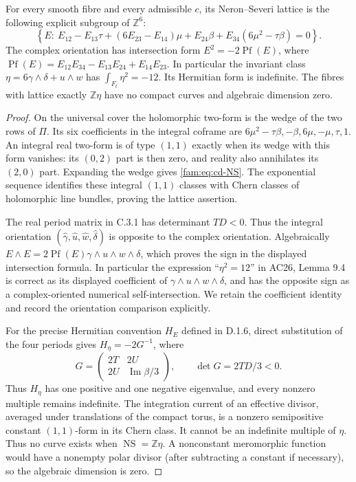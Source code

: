 \begin{proposition}\label{fam:src:D.1.4}\label{fam:st:D.1.4}
For every smooth fibre and every admissible \(c\), its Neron--Severi lattice
is the following explicit subgroup of \(\mathbb Z^6\):
\begin{equation}\label{fam:eq:cd-NS}
 \left\{E:\ E_{12}-E_{13}\tau+(6E_{23}-E_{14})\mu+
 E_{24}\beta+E_{34}(6\mu^2-\tau\beta)=0\right\}.
\end{equation}
The complex orientation has intersection form
\(E^2=-2\operatorname{Pf}(E)\), where
\(\operatorname{Pf}(E)=E_{12}E_{34}-E_{13}E_{24}+E_{14}E_{23}\).
In particular the invariant class \(\eta=6\gamma\wedge\delta+u\wedge w\)
has \(\int_{F_t}\eta^2=-12\). Its Hermitian form is indefinite.
The fibres with lattice exactly \(\mathbb Z\eta\) have no compact curves
and algebraic dimension zero.
\end{proposition}
\begin{proof}
On the universal cover the holomorphic two-form is the wedge of the two
rows of \(\Pi\). Its six coefficients in the integral coframe are
\(6\mu^2-\tau\beta,-\beta,6\mu,-\mu,\tau,1\).
An integral real two-form is of type \((1,1)\) exactly when its wedge
with this form vanishes: its \((0,2)\) part is then zero, and reality
also annihilates its \((2,0)\) part. Expanding the wedge gives
\eqref{fam:eq:cd-NS}. The exponential sequence identifies these integral
\((1,1)\) classes with Chern classes of holomorphic line bundles, proving
the lattice assertion.

The real period matrix in C.3.1 has determinant \(TD<0\). Thus the
integral orientation \((\widehat\gamma,\widehat u,\widehat w,
\widehat\delta)\) is opposite to the complex orientation. Algebraically
\(E\wedge E=2\operatorname{Pf}(E)\gamma\wedge u\wedge w\wedge\delta\),
which proves the sign in the displayed intersection formula. In
particular the expression ``\(\eta^2=12\)'' in AC26, Lemma 9.4 is correct
as its displayed coefficient of \(\gamma\wedge u\wedge w\wedge\delta\),
and has the opposite sign as a complex-oriented numerical
self-intersection. We retain the coefficient identity and record the
orientation comparison explicitly.

For the precise Hermitian convention $H_E$ defined in D.1.6, direct
substitution of the four periods gives $H_\eta=-2G^{-1}$, where
\[
 G=\begin{pmatrix}2T&2U\\2U&\operatorname{Im}\beta/3\end{pmatrix},
 \qquad \det G=2TD/3<0.
\]
Thus $H_\eta$ has one positive and one negative eigenvalue, and every
nonzero multiple remains indefinite. The integration
current of an effective divisor, averaged under translations of the
compact torus, is a nonzero semipositive constant \((1,1)\)-form in its
Chern class. It cannot be an indefinite multiple of \(\eta\).
Thus no curve exists when \(\operatorname{NS}=\mathbb Z\eta\).
A nonconstant meromorphic function would have a nonempty polar divisor
(after subtracting a constant if necessary), so the algebraic dimension
is zero.
\end{proof}

